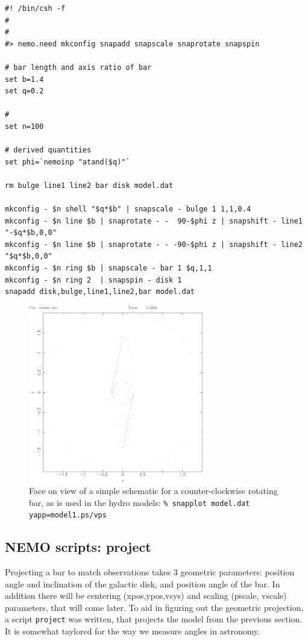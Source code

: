 \documentclass[10pt,dvips]{article}
\begin{document}
{\footnotesize\begin{verbatim}
#! /bin/csh -f
#
#
#> nemo.need mkconfig snapadd snapscale snaprotate snapspin

# bar length and axis ratio of bar
set b=1.4
set q=0.2

# 
set n=100

# derived quantities
set phi=`nemoinp "atand($q)"`

rm bulge line1 line2 bar disk model.dat

mkconfig - $n shell "$q*$b" | snapscale - bulge 1 1,1,0.4
mkconfig - $n line $b | snaprotate - -  90-$phi z | snapshift - line1 "-$q*$b,0,0"
mkconfig - $n line $b | snaprotate - - -90-$phi z | snapshift - line2 "$q*$b,0,0"
mkconfig - $n ring $b | snapscale - bar 1 $q,1,1
mkconfig - $n ring 2  | snapspin - disk 1
snapadd disk,bulge,line1,line2,bar model.dat 

\end{verbatim}\normalsize

\begin{figure}[htbp]
\centering
\includegraphics[width=3in]{model1.ps}
\caption{Face on view of a simple schematic for a counter-clockwise
rotating bar, as is used in the hydro models:\newline
 \tt \% snapplot model.dat yapp=model1.ps/vps
}
\end{figure}

\subsection{NEMO scripts: project}
 
Projecting a bar to match observations takes 3 geometric parameters:
position angle and inclination of the galactic disk, and position
angle of the bar. In addition there will be centering (xpos,ypos,vsys)
and scaling (pscale, vscale) parameters, that will come later. To
aid in figuring out the geometric projection, a script {\tt project}
was written, that projects the model from the previous section. It
is somewhat taylored for the way we measure angles in astronomy.

}
\end{document}
